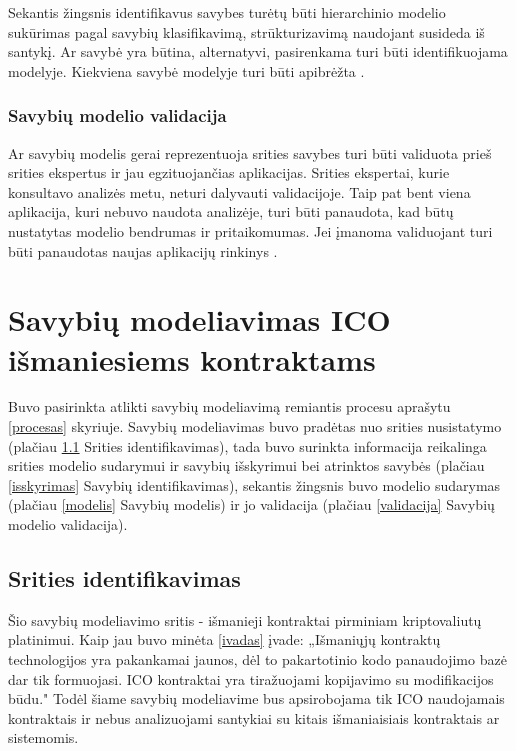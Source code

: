 \documentclass{VUMIFPSkursinis}
\begin{document}
Sekantis žingsnis identifikavus savybes turėtų būti hierarchinio modelio sukūrimas pagal savybių klasifikavimą, strūkturizavimą naudojant susideda iš santykį. Ar savybė yra būtina, alternatyvi, pasirenkama turi būti identifikuojama modelyje. Kiekviena savybė modelyje turi būti apibrėžta \cite{Kang1990}.

\subsubsection{Savybių modelio validacija}

Ar savybių modelis gerai reprezentuoja srities savybes turi būti validuota prieš srities ekspertus ir  jau egzituojančias aplikacijas. Srities ekspertai, kurie konsultavo analizės metu, neturi dalyvauti validacijoje. Taip pat bent viena aplikacija, kuri nebuvo naudota analizėje, turi būti panaudota, kad  būtų nustatytas modelio bendrumas ir pritaikomumas. Jei įmanoma validuojant turi būti panaudotas naujas aplikacijų rinkinys \cite{Kang1990}.
 


\section{Savybių modeliavimas ICO išmaniesiems kontraktams}

Buvo pasirinkta atlikti savybių modeliavimą remiantis procesu aprašytu \ref{procesas} skyriuje. Savybių modeliavimas buvo pradėtas nuo srities nusistatymo (plačiau \ref{sritis} Srities identifikavimas), tada buvo surinkta informacija reikalinga srities modelio sudarymui ir savybių išskyrimui bei atrinktos savybės (plačiau \ref{isskyrimas} Savybių identifikavimas), sekantis žingsnis buvo modelio sudarymas (plačiau \ref{modelis} Savybių modelis) ir jo validacija (plačiau \ref{validacija} Savybių modelio validacija).

\subsection{Srities identifikavimas} \label{sritis}

Šio savybių modeliavimo sritis - išmanieji kontraktai pirminiam kriptovaliutų platinimui. Kaip jau buvo minėta \ref{ivadas} įvade: „Išmaniųjų kontraktų technologijos yra pakankamai jaunos, dėl to pakartotinio kodo panaudojimo bazė dar tik formuojasi. ICO kontraktai yra tiražuojami kopijavimo su modifikacijos būdu." Todėl šiame savybių modeliavime bus apsirobojama tik ICO naudojamais kontraktais ir nebus analizuojami santykiai su kitais išmaniaisiais kontraktais ar sistemomis.
\end{document}
